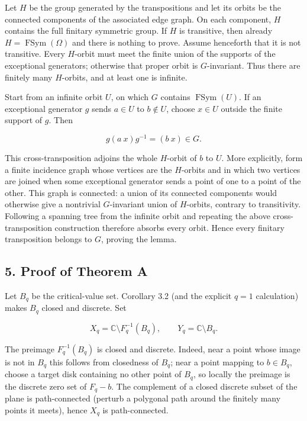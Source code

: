 Let \(H\) be the group generated by the transpositions and let its orbits be
the connected components of the associated edge graph. On each component,
\(H\) contains the full finitary symmetric group. If \(H\) is transitive,
then already \(H=\operatorname{FSym}(\Omega)\) and there is nothing to
prove. Assume henceforth that it is not transitive. Every \(H\)-orbit must
meet the finite union of the supports of the exceptional generators;
otherwise that proper orbit is \(G\)-invariant. Thus there are finitely many
\(H\)-orbits, and at least one is infinite.

Start from an infinite orbit \(U\), on which \(G\) contains
\(\operatorname{FSym}(U)\). If an exceptional generator \(g\) sends
\(a\in U\) to \(b\notin U\), choose \(x\in U\) outside the finite support
of \(g\). Then

\[
 g(a\ x)g^{-1}=(b\ x)\in G.
\]

This cross-transposition adjoins the whole \(H\)-orbit of \(b\) to \(U\).
More explicitly, form a finite incidence graph whose vertices are the
\(H\)-orbits and in which two vertices are joined when some exceptional
generator sends a point of one to a point of the other. This graph is
connected: a union of its connected components would otherwise give a
nontrivial \(G\)-invariant union of \(H\)-orbits, contrary to transitivity.
Following a spanning tree from the infinite orbit and repeating the above
cross-transposition construction therefore absorbs every orbit. Hence every
finitary transposition belongs to \(G\), proving the lemma.

\subsection{5. Proof of Theorem A}

Let \(B_q\) be the critical-value set. Corollary 3.2 (and the explicit
\(q=1\) calculation) makes \(B_q\) closed and discrete. Set

\[
 X_q=\mathbb C\setminus F_q^{-1}(B_q),\qquad
 Y_q=\mathbb C\setminus B_q.
\]

The preimage \(F_q^{-1}(B_q)\) is closed and discrete. Indeed, near a point
whose image is not in \(B_q\) this follows from closedness of \(B_q\); near
a point mapping to \(b\in B_q\), choose a target disk containing no other
point of \(B_q\), so locally the preimage is the discrete zero set of
\(F_q-b\). The complement of a closed discrete subset of the plane is
path-connected (perturb a polygonal path around the finitely many points it
meets), hence \(X_q\) is path-connected.

